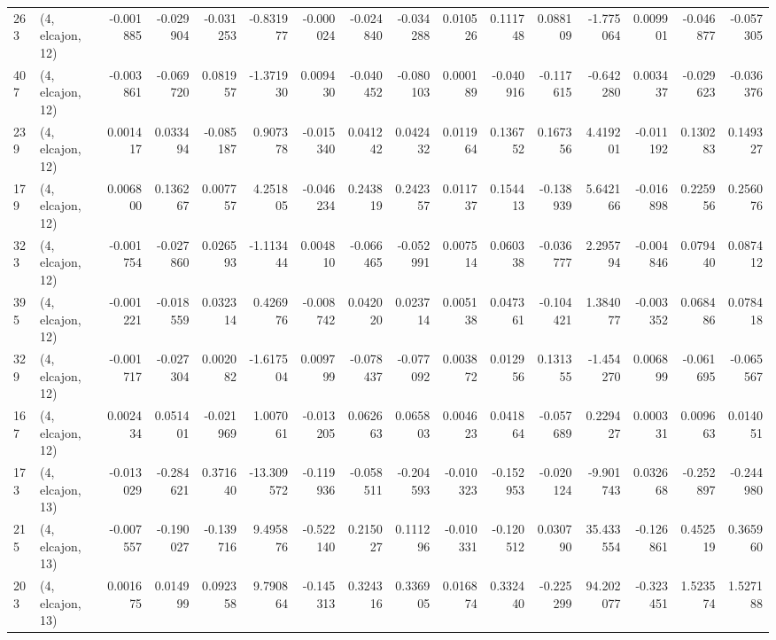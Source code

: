 \begin{tabular}{llrrrrrrrrrrrrrr}
263 &  (4, elcajon, 12) &  -0.001885 & -0.029904 & -0.031253 &   -0.831977 & -0.000024 &  -0.024840 & -0.034288 &  0.010526 &  0.111748 &  0.088109 &   -1.775064 &  0.009901 & -0.046877 & -0.057305 \\
407 &  (4, elcajon, 12) &  -0.003861 & -0.069720 &  0.081957 &   -1.371930 &  0.009430 &  -0.040452 & -0.080103 &  0.000189 & -0.040916 & -0.117615 &   -0.642280 &  0.003437 & -0.029623 & -0.036376 \\
239 &  (4, elcajon, 12) &   0.001417 &  0.033494 & -0.085187 &    0.907378 & -0.015340 &   0.041242 &  0.042432 &  0.011964 &  0.136752 &  0.167356 &    4.419201 & -0.011192 &  0.130283 &  0.149327 \\
179 &  (4, elcajon, 12) &   0.006800 &  0.136267 &  0.007757 &    4.251805 & -0.046234 &   0.243819 &  0.242357 &  0.011737 &  0.154413 & -0.138939 &    5.642166 & -0.016898 &  0.225956 &  0.256076 \\
323 &  (4, elcajon, 12) &  -0.001754 & -0.027860 &  0.026593 &   -1.113444 &  0.004810 &  -0.066465 & -0.052991 &  0.007514 &  0.060338 & -0.036777 &    2.295794 & -0.004846 &  0.079440 &  0.087412 \\
395 &  (4, elcajon, 12) &  -0.001221 & -0.018559 &  0.032314 &    0.426976 & -0.008742 &   0.042020 &  0.023714 &  0.005138 &  0.047361 & -0.104421 &    1.384077 & -0.003352 &  0.068486 &  0.078418 \\
329 &  (4, elcajon, 12) &  -0.001717 & -0.027304 &  0.002082 &   -1.617504 &  0.009799 &  -0.078437 & -0.077092 &  0.003872 &  0.012956 &  0.131355 &   -1.454270 &  0.006899 & -0.061695 & -0.065567 \\
167 &  (4, elcajon, 12) &   0.002434 &  0.051401 & -0.021969 &    1.007061 & -0.013205 &   0.062663 &  0.065803 &  0.004623 &  0.041864 & -0.057689 &    0.229427 &  0.000331 &  0.009663 &  0.014051 \\
173 &  (4, elcajon, 13) &  -0.013029 & -0.284621 &  0.371640 &  -13.309572 & -0.119936 &  -0.058511 & -0.204593 & -0.010323 & -0.152953 & -0.020124 &   -9.901743 &  0.032668 & -0.252897 & -0.244980 \\
215 &  (4, elcajon, 13) &  -0.007557 & -0.190027 & -0.139716 &    9.495876 & -0.522140 &   0.215027 &  0.111296 & -0.010331 & -0.120512 &  0.030790 &   35.433554 & -0.126861 &  0.452519 &  0.365960 \\
203 &  (4, elcajon, 13) &   0.001675 &  0.014999 &  0.092358 &    9.790864 & -0.145313 &   0.324316 &  0.336905 &  0.016874 &  0.332440 & -0.225299 &   94.202077 & -0.323451 &  1.523574 &  1.527188 \\

\end{tabular}
